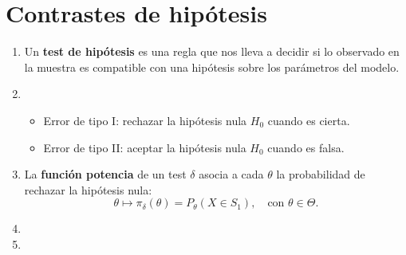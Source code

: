 \section{Contrastes de hipótesis}
\begin{enumerate}[label=\color{red}\textbf{\arabic*)}]
  \item {}

    Un \textbf{test de hipótesis} es una regla que nos lleva a decidir si lo observado en la muestra es compatible con una hipótesis sobre los parámetros del modelo. 
  \item {}
    \begin{itemize}[label=\textbullet]
      \item Error de tipo I: rechazar la hipótesis nula $H_0$ cuando es cierta.
      \item Error de tipo II: aceptar la hipótesis nula $H_0$ cuando es falsa.
    \end{itemize}
  \item {}

    La \textbf{función potencia} de un test $\delta$ asocia a cada  $\theta$ la probabilidad de rechazar la hipótesis nula:  \[
    \theta\mapsto \pi_\delta(\theta)=P_\theta(X\in S_1),\quad \text{con $\theta\in \Theta$.}
    \]  
  \item {}
  \item {}


\end{enumerate}
